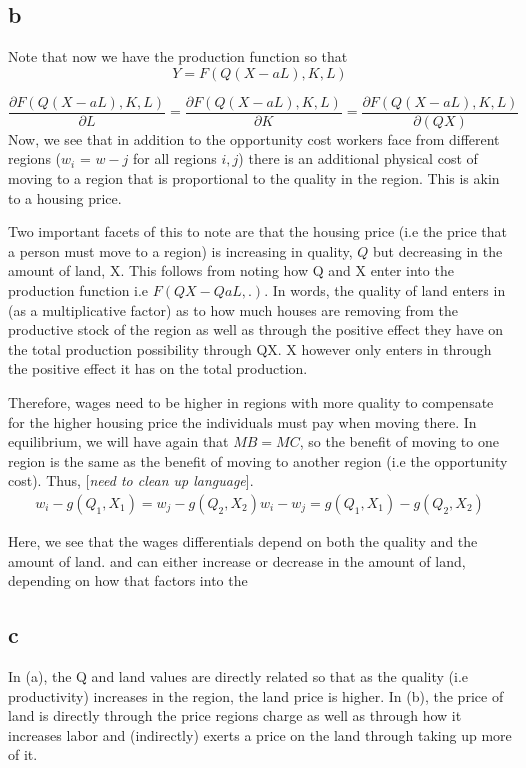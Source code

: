 \documentclass{article}
\begin{document}
\subsection*{b}
Note that now we have the production function so that 
$$ Y = F(Q(X-aL),K,L)$$

$$\frac{\partial{F(Q(X-aL),K,L)}}{\partial L} = \frac{\partial F(Q(X-aL),K,L)}{\partial K} = \frac{\partial F(Q(X-aL),K,L)}{\partial (QX)} $$
Now, we see that in addition to the opportunity cost workers face from different regions ($w_i$ = $w-j$ for all regions $i,j$) there is an additional physical cost of moving to a region that is proportional to the quality in the region. This is akin to a housing price. \par
Two important facets of this to note are that the housing price (i.e the price that a person must move to a region) is increasing in quality, $Q$ but decreasing in the amount of land, X. This follows from noting how Q and X enter into the production function i.e $F(QX-QaL,.)$. In words, the quality of land enters in (as a multiplicative factor) as to how much houses are removing from the productive stock of the region as well as through the positive effect they have on the total production possibility through QX. X however only enters in through the positive effect it has on the total production. \par 
Therefore, wages need to be higher in regions with more quality to compensate for the higher housing price the individuals must pay when moving there. In equilibrium, we will have again that $ MB = MC$, so the benefit of moving to one region is the same as the benefit of moving to another region (i.e the opportunity cost). Thus, [\textit{need to clean up language}].  \\
\begin{align}
    w_i - g(Q_1,X_1) = w_j - g(Q_2,X_2) 
    w_i - w_j = g(Q_1,X_1) - g(Q_2,X_2)
\end{align} \par
Here, we see that the wages differentials depend on both the quality and the amount of land. and can either increase or decrease in the amount of land, depending on how that factors into the 
\pagebreak
\subsection*{c}
In (a), the Q and land values are directly related so that as the quality (i.e productivity) increases in the region, the land price is higher. In (b), the price of land is directly through the price regions charge as well as through how it increases labor and (indirectly) exerts a price on the land through taking up more of it.  
\end{document}

